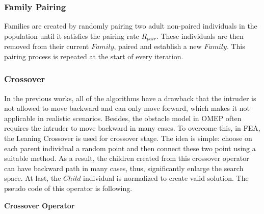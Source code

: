 \documentclass[final]{elsarticle}
\begin{document}
\subsubsection{Family Pairing}

Families are created by randomly pairing two adult non-paired individuals in the population until it satisfies the pairing rate $R_{pair}$. These individuals are then removed from their current $ Family $, paired and establish a new $Family$. This pairing process is repeated at the start of every iteration.

\subsubsection{Crossover}

In the previous works, all of the algorithms have a drawback that the intruder is not allowed to move backward and can only move forward, which makes it not applicable in realistic scenarios. Besides, the obstacle model in OMEP often requires the intruder to move backward in many cases. To overcome this, in FEA, the Leaning Crossover is used for crossover stage. The idea is simple: choose on each parent individual a random point and then connect these two point using a suitable method. As a result, the children created from this crossover operator can have backward path in many cases, thus, significantly enlarge the search space. At last, the $Child$ individual is normalized to create valid solution. The pseudo code of this operator is following.

\begin{algorithm}[H]
	\SetAlgoLined
	\caption{\textbf{Crossover Operator}} 
	\label{alg.2}
\end{algorithm} 
\end{document}
